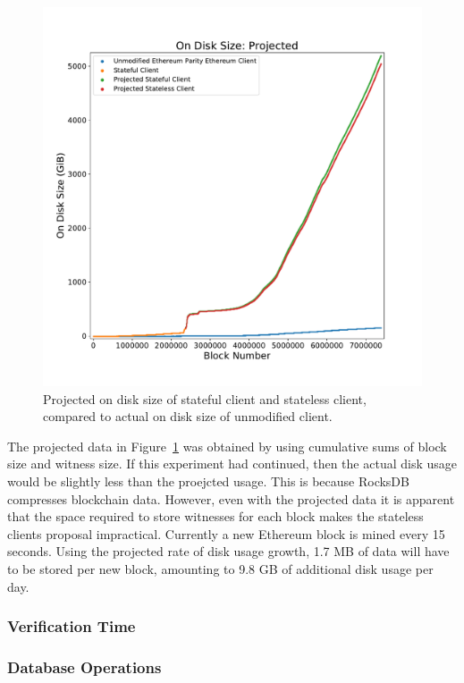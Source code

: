 \documentclass[12pt]{article}
\begin{document}
\begin{figure}[H]
  \centering
  \includegraphics[width=\textwidth]{../figures/results/graphs/background/projected-on-disk-size.pdf}
  \caption{Projected on disk size of stateful client and stateless client, compared to actual on disk size of unmodified client.}
  \label{fig:projectedondisksize}
\end{figure}

The projected data in Figure~\ref{fig:projectedondisksize} was obtained by using cumulative sums of block size and witness size. If this experiment had continued, then the actual disk usage would be slightly less than the proejcted usage. This is because RocksDB compresses blockchain data. However, even with the projected data it is apparent that the space required to store witnesses for each block makes the stateless clients proposal impractical. Currently a new Ethereum block is mined every 15 seconds. Using the projected rate of disk usage growth, 1.7 MB of data will have to be stored per new block, amounting to 9.8 GB of additional disk usage per day.

\subsubsection{Verification Time}

\subsubsection{Database Operations}
\end{document}
